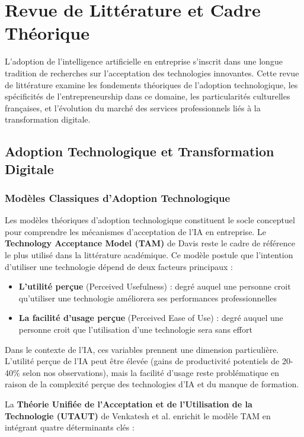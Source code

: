 \documentclass[12pt,a4paper]{report}
\begin{document}
\chapter{Revue de Littérature et Cadre Théorique}

L'adoption de l'intelligence artificielle en entreprise s'inscrit dans une longue tradition de recherches sur l'acceptation des technologies innovantes. Cette revue de littérature examine les fondements théoriques de l'adoption technologique, les spécificités de l'entrepreneurship dans ce domaine, les particularités culturelles françaises, et l'évolution du marché des services professionnels liés à la transformation digitale.

\section{Adoption Technologique et Transformation Digitale}

\subsection{Modèles Classiques d'Adoption Technologique}

Les modèles théoriques d'adoption technologique constituent le socle conceptuel pour comprendre les mécanismes d'acceptation de l'IA en entreprise. Le \textbf{Technology Acceptance Model (TAM)} de Davis \cite{davis1989perceived} reste le cadre de référence le plus utilisé dans la littérature académique. Ce modèle postule que l'intention d'utiliser une technologie dépend de deux facteurs principaux :

\begin{itemize}
\item \textbf{L'utilité perçue} (Perceived Usefulness) : degré auquel une personne croit qu'utiliser une technologie améliorera ses performances professionnelles
\item \textbf{La facilité d'usage perçue} (Perceived Ease of Use) : degré auquel une personne croit que l'utilisation d'une technologie sera sans effort
\end{itemize}

Dans le contexte de l'IA, ces variables prennent une dimension particulière. L'utilité perçue de l'IA peut être élevée (gains de productivité potentiels de 20-40\% selon nos observations), mais la facilité d'usage reste problématique en raison de la complexité perçue des technologies d'IA et du manque de formation.

La \textbf{Théorie Unifiée de l'Acceptation et de l'Utilisation de la Technologie (UTAUT)} de Venkatesh et al. \cite{venkatesh2003user} enrichit le modèle TAM en intégrant quatre déterminants clés :
\end{document}
